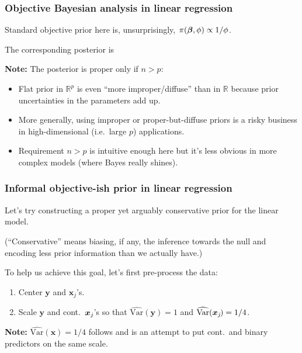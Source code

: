\documentclass[18pt]{beamer}
\newcommand{\defineTightItemizeSpacing}{%
	\setlength{\abovedisplayskip}{.25\baselineskip}%
	\setlength{\belowdisplayskip}{.25\baselineskip}%
}
\newenvironment{tightEquation*}{%
	\defineTightItemizeSpacing%
	\begin{equation*}
}{
	\end{equation*} \ignorespacesafterend
}
\newenvironment{narrowItemize}[1][]{%
  \vspace{-.3\baselineskip}%
  \begin{itemize}[#1]
  \addtolength\itemsep{-.1\baselineskip}
}{
  \end{itemize}
}
\newenvironment{narrowEnumerate}[1][1.]{%
  \vspace{-.3\baselineskip}%
  \begin{enumerate}[#1]
  \addtolength\itemsep{-.1\baselineskip}
}{
  \end{enumerate}
}
\newcommand{\given}{\thinnerspace | \thinnerspace}
\newcommand{\transpose}{\text{\raisebox{.5ex}{$\intercal$}}}
\newcommand{\thinnerspace}{\mskip.5\thinmuskip}
\newcommand{\variance}{\mathrm{Var}}
\newcommand{\normalDist}{\mathcal{N}}
\newcommand{\gammaDist}{\mathrm{Gamma}}
\newcommand{\mle}[1]{\widehat{#1}_{\textrm{mle}}}
\newcommand{\nPred}{p}
\newcommand{\density}{\pi}
\newcommand{\by}{\bm{y}}
\newcommand{\bx}{\bm{x}}
\newcommand{\bX}{\bm{X}}
\newcommand{\bbeta}{\bm{\beta}}
\begin{document}
\begin{frame}
\frametitle{Objective Bayesian analysis in linear regression}
Standard objective prior here is, unsurprisingly, $\thinnerspace \density(\bbeta, \phi) \propto 1 / \phi$.

\pause
The corresponding posterior is
\begin{tightEquation*}
\end{tightEquation*}

\pause
\textbf{Note:} The posterior is proper only if $n > \nPred$:
\begin{narrowItemize}[<+->]
\item Flat prior in $\mathbb{R}^\nPred$ is even ``more improper/diffuse'' than in $\mathbb{R}$ because prior uncertainties in the parameters add up.
\item More generally, using improper or proper-but-diffuse priors is a risky business in high-dimensional (i.e.\ large $\nPred$) applications.
\item Requirement $n > \nPred$ is intuitive enough here but it's less obvious in more complex models (where Bayes really shines).
\end{narrowItemize}
\end{frame}


\begin{frame}
\frametitle{Informal objective-ish prior in linear regression}
Let's try constructing a proper yet arguably conservative prior for the linear model.

\pause
(``Conservative'' means biasing, if any, the inference towards the null and encoding less prior information than we actually have.)

\pause
To help us achieve this goal, let's first pre-process the data:
\begin{narrowEnumerate}
\item Center $\bm{y}$ and $\bx_j$'s. %
\item Scale $\bm{y}$ and cont.\ $\bx_j\mkern-1mu$'s so that $\widehat{\variance}(\by) = 1$ and $\widehat{\variance}(\bx_j \mkern-2mu) = 1/4$.%
\end{narrowEnumerate}

\pause
\textbf{Note:} $\widehat{\variance}(\bx) = 1/4$ follows \citet{gelman2008default_prior} and is an attempt to put cont.\ and binary predictors on the same scale. 
\end{frame}
\end{document}
